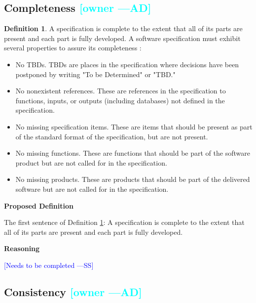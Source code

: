 \documentclass[letterpaper,cleveref]{lipics-v2019}
\newcommand{\authornote}[3]{\textcolor{#1}{[#3 ---#2]}}
\newcommand{\authornote}[3]{}
\newcommand{\wss}[1]{\authornote{blue}{SS}{#1}} %
\newcommand{\ad}[1]{\authornote{cyan}{AD}{#1}} %
\theoremstyle{definition}
\newtheorem{defn}{Definition}
\begin{document}
\subsection{Completeness \ad{owner}}

\begin{defn}
\label{CompletenessSelected}
A specification is complete to the extent that all of its parts are present and
each part is fully developed. A software specification must exhibit several
properties to assure its completeness \citep{Boehm1984}:
\begin{itemize}
\item No TBDs. TBDs are places in the specification where decisions have been
postponed by writing "To be Determined" or "TBD."
\item No nonexistent references. These are references in the specification to
functions, inputs, or outputs (including databases) not defined in the
specification.
\item No missing specification items. These are items that should be present as
part of the standard format of the specification, but are not present.
\item No missing functions. These are functions that should be part of the
software product but are not called for in the specification.
\item No missing products. These are products that should be part of the
delivered software but are not called for in the specification.
\end{itemize}
\end{defn}

\noindent \textbf{Proposed Definition} 

The first sentence of Definition \ref{CompletenessSelected}: A specification is
complete to the extent that all of its parts are present and each part is fully
developed.

\noindent \textbf{Reasoning}

\wss{Needs to be completed}

\subsection{Consistency \ad{owner}}
\end{document}
